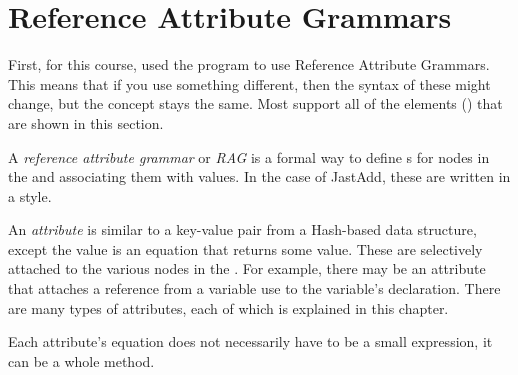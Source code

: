 \section{Reference Attribute Grammars}\label{sec:Reference_Attribute_Grammars}
First, for this course, \theauthor{} used the \JastAdd{} program to use Reference Attribute Grammars.
This means that if you use something different, then the syntax of these might change, but the concept stays the same.
Most  support all of the elements () that are shown in this section.

\begin{definition}\label{def:Reference_Attribute_Grammar}
  A \emph{reference attribute grammar} or \emph{RAG} is a formal way to define s for nodes in the  and associating them with values.
  In the case of JastAdd, these are written in a  style.
\end{definition}

\begin{definition}[Attribute]\label{def:Attribute}
  An \emph{attribute} is similar to a key-value pair from a Hash-based data structure, except the value is an equation that returns some value.
  These are selectively attached to the various nodes in the .
  For example, there may be an attribute that attaches a reference from a variable use to the variable's declaration.
  There are many types of attributes, each of which is explained in this chapter.

  Each attribute's equation does not necessarily have to be a small expression, it can be a whole method.
\end{definition}

